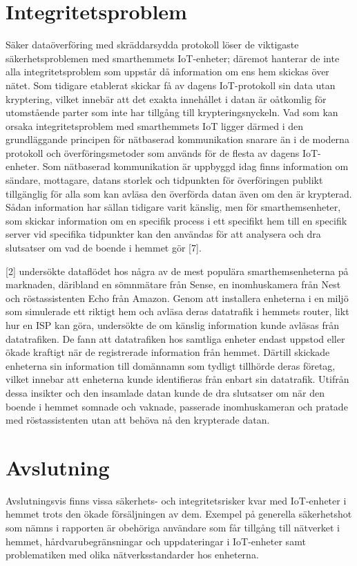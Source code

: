 \documentclass[conference]{IEEEtran}
\begin{document}
\section{Integritetsproblem}
Säker dataöverföring med skräddarsydda protokoll löser de viktigaste säkerhetsproblemen med smarthemmets IoT-enheter; däremot hanterar de inte alla integritetsproblem som uppstår då information om ens hem skickas över nätet. Som tidigare etablerat skickar få av dagens IoT-protokoll sin data utan kryptering, vilket innebär att det exakta innehållet i datan är oåtkomlig för utomstående parter som inte har tillgång till krypteringsnyckeln. Vad som kan orsaka integritetsproblem med smarthemmets IoT ligger därmed i den grundläggande principen för nätbaserad kommunikation snarare än i de moderna protokoll och överföringsmetoder som används för de flesta av dagens IoT-enheter. Som nätbaserad kommunikation är uppbyggd idag finns information om sändare, mottagare, datans storlek och tidpunkten för överföringen publikt tillgänglig för alla som kan avläsa den överförda datan även om den är krypterad. Sådan information har sällan tidigare varit känslig, men för smarthemsenheter, som skickar information om en specifik process i ett specifikt hem till en specifik server vid specifika tidpunkter kan den användas för att analysera och dra slutsatser om vad de boende i hemmet gör [7]. 

[2] undersökte dataflödet hos några av de mest populära smarthemsenheterna på marknaden, däribland en sömnmätare från Sense, en inomhuskamera från Nest och röstassistenten Echo från Amazon. Genom att installera enheterna i en miljö som simulerade ett riktigt hem och avläsa deras datatrafik i hemmets router, likt hur en ISP kan göra, undersökte de om känslig information kunde avläsas från datatrafiken. De fann att datatrafiken hos samtliga enheter endast uppstod eller ökade kraftigt när de registrerade information från hemmet. Därtill skickade enheterna sin information till domännamn som tydligt tillhörde deras företag, vilket innebar att enheterna kunde identifieras från enbart sin datatrafik. Utifrån dessa insikter och den insamlade datan kunde de dra slutsatser om när den boende i hemmet somnade och vaknade, passerade inomhuskameran och pratade med röstassistenten utan att behöva nå den krypterade datan. 


\section{Avslutning}
Avslutningsvis finns vissa säkerhets- och integritetsrisker kvar med IoT-enheter i hemmet trots den ökade försäljningen av dem. Exempel på generella säkerhetshot som nämns i rapporten är obehöriga användare som får tillgång till nätverket i hemmet, hårdvarubegränsningar och uppdateringar i IoT-enheter samt problematiken med olika nätverksstandarder hos enheterna.
\end{document}
